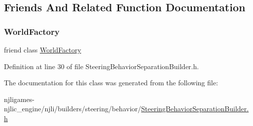 \subsection{Friends And Related Function Documentation}
\mbox{\label{classnjli_1_1_steering_behavior_separation_builder_acb96ebb09abe8f2a37a915a842babfac}} 
\subsubsection{\texorpdfstring{World\+Factory}{WorldFactory}}
{\footnotesize\ttfamily friend class \mbox{\hyperlink{classnjli_1_1_world_factory}{World\+Factory}}\hspace{0.3cm}{\ttfamily [friend]}}



Definition at line 30 of file Steering\+Behavior\+Separation\+Builder.\+h.



The documentation for this class was generated from the following file\+:\begin{DoxyCompactItemize}
\item 
njligames-\/njlic\+\_\+engine/njli/builders/steering/behavior/\mbox{\hyperlink{_steering_behavior_separation_builder_8h}{Steering\+Behavior\+Separation\+Builder.\+h}}\end{DoxyCompactItemize}
